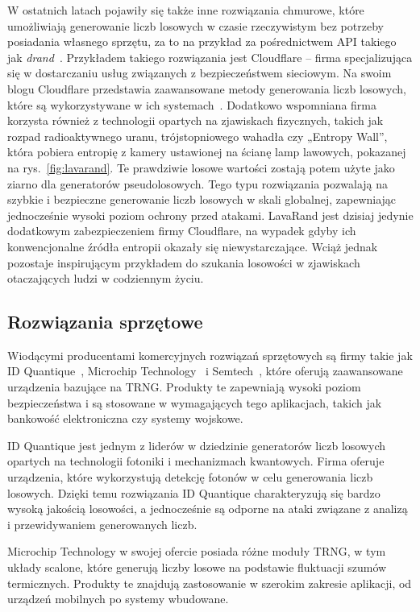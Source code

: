 W ostatnich latach pojawiły się także inne rozwiązania chmurowe, które umożliwiają generowanie liczb losowych w czasie rzeczywistym bez potrzeby posiadania własnego sprzętu,
za to na przykład za pośrednictwem API takiego jak \textit{drand}~\cite{drand_documentation}.
Przykładem takiego rozwiązania jest Cloudflare – firma specjalizująca się w dostarczaniu usług związanych z bezpieczeństwem sieciowym.
Na swoim blogu Cloudflare przedstawia zaawansowane metody generowania liczb losowych, które są wykorzystywane w ich systemach~\cite{cloudflare_league_of_entropy}.
Dodatkowo wspomniana firma korzysta również z technologii opartych na zjawiskach fizycznych, takich jak rozpad radioaktywnego uranu,
trójstopniowego wahadła czy „Entropy Wall”, która pobiera entropię z kamery
ustawionej na ścianę lamp lawowych, pokazanej na rys.~\ref{fig:lavarand}.
Te prawdziwie losowe wartości zostają potem użyte jako ziarno dla generatorów pseudolosowych.
Tego typu rozwiązania pozwalają na szybkie i bezpieczne generowanie liczb losowych w skali globalnej, zapewniając jednocześnie wysoki poziom ochrony przed atakami.
LavaRand jest dzisiaj jedynie dodatkowym zabezpieczeniem firmy Cloudflare,
na wypadek gdyby ich konwencjonalne źródła entropii okazały się niewystarczające.
Wciąż jednak pozostaje inspirującym przykładem do szukania losowości w zjawiskach otaczających ludzi w codziennym życiu.

\subsection{Rozwiązania sprzętowe}\label{subsec:rozwiazania-sprzetowe}
Wiodącymi producentami komercyjnych rozwiązań sprzętowych są firmy takie jak
ID Quantique~\cite{IDQ}, Microchip Technology~\cite{MicrochipTechnology} i Semtech~\cite{Semtech},
które oferują zaawansowane urządzenia bazujące na TRNG.
Produkty te zapewniają wysoki poziom bezpieczeństwa i są stosowane w wymagających tego aplikacjach,
takich jak bankowość elektroniczna czy systemy wojskowe.

ID Quantique jest jednym z liderów w dziedzinie generatorów liczb losowych opartych na technologii fotoniki i mechanizmach kwantowych.
Firma oferuje urządzenia, które wykorzystują detekcję fotonów w celu generowania liczb losowych.
Dzięki temu rozwiązania ID Quantique charakteryzują się bardzo wysoką jakością losowości, a jednocześnie są odporne na ataki związane z analizą i przewidywaniem generowanych liczb.

Microchip Technology w swojej ofercie posiada różne moduły TRNG, w tym układy scalone,
które generują liczby losowe na podstawie fluktuacji szumów termicznych.
Produkty te znajdują zastosowanie w szerokim zakresie aplikacji, od urządzeń mobilnych po systemy wbudowane.

